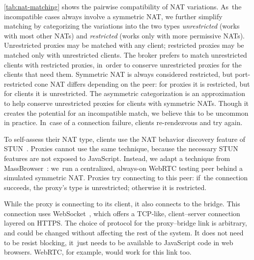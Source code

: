 \documentclass[letterpaper,twocolumn]{article}
\newcommand{\firstterm}[1]{\textit{#1}}
\begin{document}
\autoref{tab:nat-matching}
shows the pairwise compatibility of NAT variations.
As~the incompatible cases always involve a symmetric NAT,
we further simplify matching by categorizing the variations into the two types
\firstterm{unrestricted} (works with most other NATs) and
\firstterm{restricted} (works only with more permissive NATs).
Unrestricted proxies may be matched with any client;
restricted proxies may be matched only with unrestricted clients.
The broker prefers to match unrestricted clients with restricted proxies,
in~order to conserve unrestricted proxies
for the clients that need them.
Symmetric NAT is always considered restricted,
but port-restricted cone NAT differs
depending on the peer:
for proxies it is restricted, but
for clients it is unrestricted.
The asymmetric categorization is an approximation
to help conserve unrestricted proxies
for clients with symmetric NATs.
Though it creates the potential for an incompatible match,
we believe this to be uncommon in practice.
In~case of a connection failure,
clients re-rendezvous and try again.

To self-assess their NAT type,
clients use the NAT behavior discovery feature of STUN~\cite{rfc5780}.
Proxies cannot use the same technique,
because the necessary STUN features are not exposed
to JavaScript.
Instead,
we adapt a technique from MassBrowser~\cite[\S \mbox{V-A}]{Nasr2020a}:
we~run a centralized, always-on WebRTC testing peer
behind a simulated symmetric NAT.
Proxies try connecting to this peer:
if~the connection succeeds, the proxy's type is unrestricted;
otherwise it is restricted.

While the proxy is connecting to its client,
it also connects to the bridge.
This connection
uses WebSocket~\cite{rfc6455}, which
offers a TCP-like, client--server connection
layered on HTTPS.
The choice of protocol for the proxy--bridge link is arbitrary,
and could be changed
without affecting the rest of the system.
It does not need to be resist blocking,
it~just needs to be available to JavaScript code in web browsers.
WebRTC, for example, would work for this link too.
\end{document}
